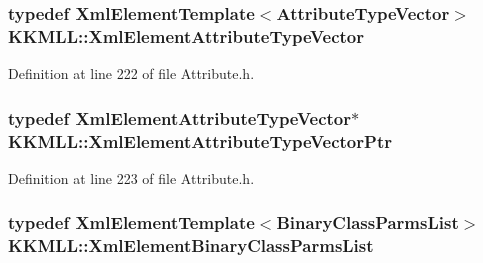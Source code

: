 \subsubsection[{\texorpdfstring{Xml\+Element\+Attribute\+Type\+Vector}{XmlElementAttributeTypeVector}}]{\setlength{\rightskip}{0pt plus 5cm}typedef {\bf Xml\+Element\+Template}$<${\bf Attribute\+Type\+Vector}$>$ {\bf K\+K\+M\+L\+L\+::\+Xml\+Element\+Attribute\+Type\+Vector}}\hypertarget{namespace_k_k_m_l_l_a1ccbd28bdf9fa8ab7c102256debc760a}{}\label{namespace_k_k_m_l_l_a1ccbd28bdf9fa8ab7c102256debc760a}


Definition at line 222 of file Attribute.\+h.

\subsubsection[{\texorpdfstring{Xml\+Element\+Attribute\+Type\+Vector\+Ptr}{XmlElementAttributeTypeVectorPtr}}]{\setlength{\rightskip}{0pt plus 5cm}typedef {\bf Xml\+Element\+Attribute\+Type\+Vector}$\ast$ {\bf K\+K\+M\+L\+L\+::\+Xml\+Element\+Attribute\+Type\+Vector\+Ptr}}\hypertarget{namespace_k_k_m_l_l_aa7746fb63f9f6681844ce4c35072b75a}{}\label{namespace_k_k_m_l_l_aa7746fb63f9f6681844ce4c35072b75a}


Definition at line 223 of file Attribute.\+h.

\subsubsection[{\texorpdfstring{Xml\+Element\+Binary\+Class\+Parms\+List}{XmlElementBinaryClassParmsList}}]{\setlength{\rightskip}{0pt plus 5cm}typedef {\bf Xml\+Element\+Template}$<${\bf Binary\+Class\+Parms\+List}$>$ {\bf K\+K\+M\+L\+L\+::\+Xml\+Element\+Binary\+Class\+Parms\+List}}\hypertarget{namespace_k_k_m_l_l_a89ae108d23713fb8f26f6954c70d5cf6}{}\label{namespace_k_k_m_l_l_a89ae108d23713fb8f26f6954c70d5cf6}


